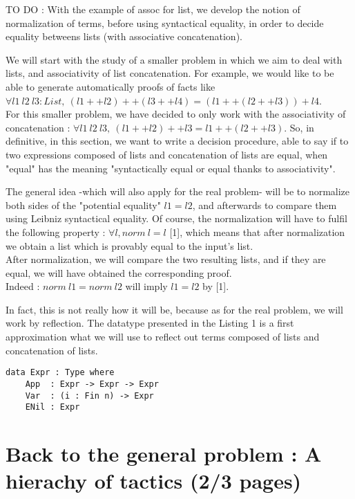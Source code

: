 \documentclass{sigplanconf}
\begin{document}
TO DO : With the example of assoc for list, we develop the notion of normalization of terms, before using syntactical equality, in order to decide equality betweens lists (with associative concatenation).

We will start with the study of a smaller problem in which we aim to deal with lists, and associativity of list concatenation.
For example, we would like to be able to generate automatically proofs of facts like $\forall l1\ l2\ l3 : List,\ (l1 ++ l2) ++ (l3 ++ l4) = (l1 ++ (l2 ++ l3)) + l4$. \\
For this smaller problem, we have decided to only work with the associativity of concatenation : $\forall l1\ l2\ l3,\ (l1 ++ l2) ++ l3 = l1 ++ (l2 ++ l3)$.
So, in definitive, in this section, we want to write a decision procedure, able to say if to two expressions composed of lists and concatenation of lists are equal, when "equal" has the meaning "syntactically equal or equal thanks to associativity".

The general idea -which will also apply for the real problem- will be to normalize both sides of the "potential equality" $l1=l2$, and afterwards to compare them using Leibniz syntactical equality.
Of course, the normalization will have to fulfil the following property :
$\forall l, norm\ l = l$ [1], which means that after normalization we obtain a list which is provably equal to the input's list. \\
After normalization, we will compare the two resulting lists, and if they are equal, we will have obtained the corresponding proof.  \\
Indeed :
$norm\ l1 = norm\ l2$ will imply $l1=l2$ by [1].

In fact, this is not really how it will be, because as for the real problem, we will work by reflection. The datatype presented in the Listing 1 is a first approximation what we will use to reflect out terms composed of lists and concatenation of lists.

\begin{lstlisting}[caption=Reflected lists, captionpos=b, label=lst1:haskell2]
data Expr : Type where
	App  : Expr -> Expr -> Expr 
	Var  : (i : Fin n) -> Expr
    ENil : Expr
\end{lstlisting}







\section {Back to the general problem : A hierachy of tactics (2/3 pages)}
\end{document}
